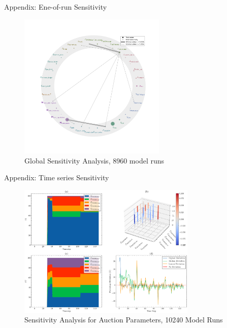\documentclass{beamer}
\begin{document}
\begin{frame}{Appendix: Ene-of-run Sensitivity}
\begin{figure}
\centering
\includegraphics[width=70mm]{Figs/Sobol' Sensitivity Analysis, 8960 Model Runs.pdf}
\caption{Global Sensitivity Analysis, 8960 model runs}
\label{fig3}
\end{figure}
\end{frame}

\begin{frame}{Appendix: Time series Sensitivity}
\begin{figure}
\centering
\includegraphics[width=85mm]{Figs/SOBOL_time_series_for_problem_cliplike_n10.pdf}
\caption{Sensitivity Analysis for Auction Parameters, 10240 Model Runs}
\label{fig4}
\end{figure}
\end{frame}


\end{document}
